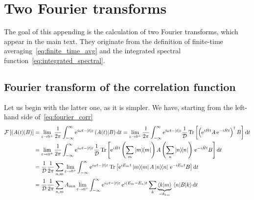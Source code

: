 \chapter{Two Fourier transforms\label{app:fourier}}
\thispagestyle{chapterBeginStyle}
The goal of this appending is the calculation of two Fourier transforms, which appear in the main text.
They originate from the definition of finite-time averaging~\eqref{eq:finite_time_avg} and
the integrated spectral function~\eqref{eq:integrated_spectral}.
\section{Fourier transform of the correlation function}
Let us begin with the latter one,
as it is simpler. We have, starting from the left-hand side of~\eqref{eq:fourier_corr}
{\allowdisplaybreaks
\begin{align}
    \mathcal{F}\left[\hs{A(t)}{B}\right] & = \lim _{\varepsilon \to 0^+} \frac{1}{2 \pi} \int_{-\infty}^{\infty}
    \mathrm{e}^{i \omega t- \vert t \vert  \varepsilon}\hs{A(t)}{B} \dd{t} = \lim _{\varepsilon \to 0^+} \frac{1}{2 \pi}
    \int_{-\infty}^{\infty} \mathrm{e}^{i \omega t-\vert t \vert  \varepsilon} \frac{1}{\dimension}
    \Tr\left[\left(\mathrm{e}^{i \hat{H}  t}A\,\mathrm{e}^{-i \hat{H}  t}\right)^{\dagger}B\right] \dd{t} \nonumber                                                             \\
                                         & =\lim _{\varepsilon \to 0^+} \frac{1}{2 \pi}
    \int_{-\infty}^{\infty} \mathrm{e}^{i \omega t-|t| \varepsilon} \frac{1}{\dimension}
    \Tr\left[\mathrm{e}^{i \hat{H}  t}\left(\sum_{m} \ketbra{m}{m}\right)
    A\left(\sum_{n} \ketbra{n}{n}\right)\,\mathrm{e}^{-i \hat{H}  t}B\right]\dd{t}  \nonumber                                                                 \\
                                         & = \frac{1}{\dimension} \frac{1}{2 \pi}\sum_{n,m} \lim _{\varepsilon \to 0^+}
    \int_{-\infty}^{\infty} \mathrm{e}^{i \omega t-\vert t \vert  \varepsilon}
    \Tr\left[\mathrm{e}^{i E_m t}\ketbra{m}{m} A\ketbra{n}{n}\,\mathrm{e}^{-i E_n t}B\right] \dd{t} \nonumber                                   \\
                                         & = \frac{1}{\dimension} \frac{1}{2 \pi}\sum_{n,m} A_{mn}  \lim _{\varepsilon \to 0^+}
    \int_{-\infty}^{\infty} \mathrm{e}^{i \omega t-|t| \varepsilon}\,\mathrm{e}^{i (E_m-E_n) t}
    \sum_{k} \underbrace{\braket{k}{m}}_{=\delta_{km}} \matrixel{n}{B}{k} \dd{t} \nonumber                                                \\

\end{align}}

